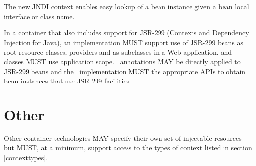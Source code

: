\begin{note}The new  JNDI context enables easy lookup of a bean instance given a bean local interface or class name.\end{note}

In a container that also includes support for JSR-299 (Contexts and Dependency Injection for Java), an implementation MUST support use of JSR-299 beans as root resource classes, providers and as  subclasses in a Web application.  and  classes MUST use application scope. \jaxrs\ annotations MAY be directly applied to JSR-299 beans and the \jaxrs\ implementation MUST the appropriate APIs to obtain bean instances that use JSR-299 facilities.

\section{Other}

Other container technologies MAY specify their own set of injectable resources but MUST, at a minimum, support access to the types of context listed in section \ref{contexttypes}.
